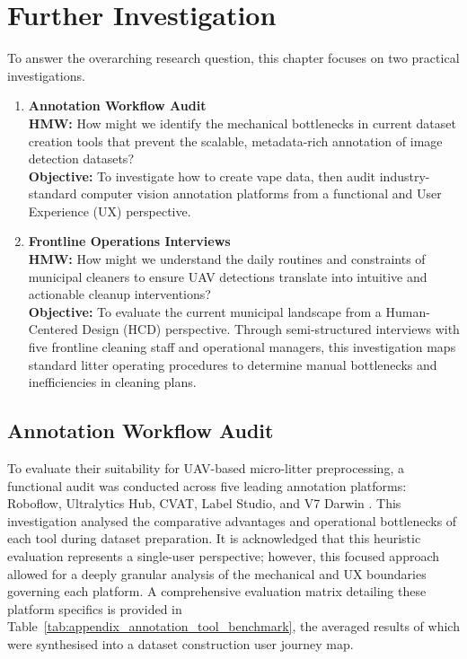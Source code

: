 \section{Further Investigation}

To answer the overarching research question, this chapter focuses on two practical investigations. 

\begin{enumerate}
    \item \textbf{Annotation Workflow Audit} \\
    \textbf{HMW:} How might we identify the mechanical bottlenecks in current dataset creation tools that prevent the scalable, metadata-rich annotation of image detection datasets? \\
    \textbf{Objective:} To investigate how to create vape data, then audit industry-standard computer vision annotation platforms from a functional and User Experience (UX) perspective.

    \item \textbf{Frontline Operations Interviews} \\
    \textbf{HMW:} How might we understand the daily routines and constraints of municipal cleaners to ensure UAV detections translate into intuitive and actionable cleanup interventions? \\
    \textbf{Objective:} To evaluate the current municipal landscape from a Human-Centered Design (HCD) perspective. Through semi-structured interviews with five frontline cleaning staff and operational managers, this investigation maps standard litter operating procedures to determine manual bottlenecks and inefficiencies in cleaning plans.
\end{enumerate}

\subsection{Annotation Workflow Audit}

To evaluate their suitability for UAV-based micro-litter preprocessing, a functional audit was conducted across five leading annotation platforms: Roboflow, Ultralytics Hub, CVAT, Label Studio, and V7 Darwin \cite{roboflow_docs,ultralytics_platform_docs,cvat_docs,labelstudio_docs,v7darwin_product}. This investigation analysed the comparative advantages and operational bottlenecks of each tool during dataset preparation. It is acknowledged that this heuristic evaluation represents a single-user perspective; however, this focused approach allowed for a deeply granular analysis of the mechanical and UX boundaries governing each platform. A comprehensive evaluation matrix detailing these platform specifics is provided in Table~\ref{tab:appendix_annotation_tool_benchmark}, the averaged results of which were synthesised into a dataset construction user journey map.

